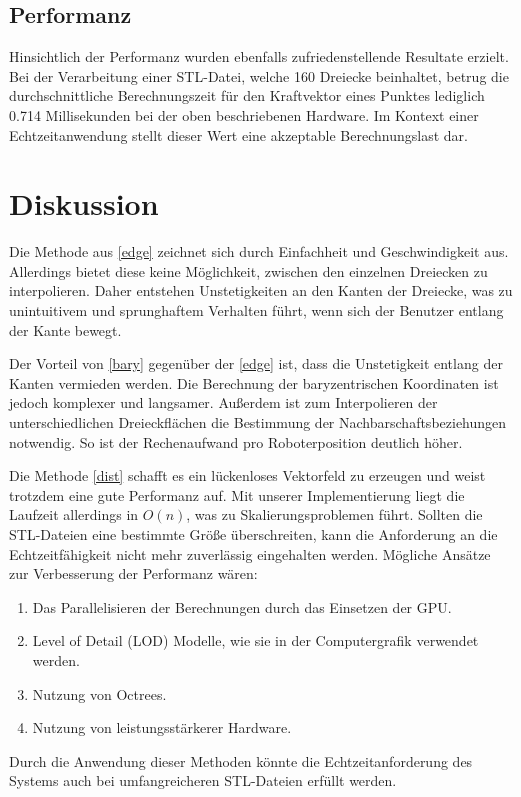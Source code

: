 \documentclass[conference]{IEEEtran}
\begin{document}
\subsection{Performanz}
Hinsichtlich der Performanz wurden ebenfalls zufriedenstellende Resultate erzielt. Bei der Verarbeitung einer STL-Datei, welche 160 Dreiecke beinhaltet, betrug die durchschnittliche Berechnungszeit für den Kraftvektor eines Punktes lediglich 0.714 Millisekunden bei der oben beschriebenen Hardware. Im Kontext einer Echtzeitanwendung stellt dieser Wert eine akzeptable Berechnungslast dar. 

\section{Diskussion}
Die Methode aus \ref*{edge} zeichnet sich durch Einfachheit und Geschwindigkeit aus. Allerdings bietet  diese keine Möglichkeit, zwischen den einzelnen Dreiecken zu interpolieren. Daher entstehen Unstetigkeiten an den Kanten der Dreiecke, was zu unintuitivem und sprunghaftem Verhalten führt, wenn sich der Benutzer entlang der Kante bewegt.

Der Vorteil von \ref*{bary} gegenüber der \ref*{edge} ist, dass die Unstetigkeit entlang der Kanten vermieden werden. Die Berechnung der baryzentrischen Koordinaten ist jedoch komplexer und langsamer. Außerdem ist zum Interpolieren der unterschiedlichen Dreieckflächen die Bestimmung der Nachbarschaftsbeziehungen notwendig. So ist der Rechenaufwand pro Roboterposition deutlich höher.

Die Methode \ref*{dist} schafft es ein lückenloses Vektorfeld zu erzeugen und weist trotzdem eine gute Performanz auf. Mit unserer Implementierung liegt die Laufzeit allerdings in $O(n)$, was zu Skalierungsproblemen führt. Sollten die STL-Dateien eine bestimmte Größe überschreiten, kann die Anforderung an die Echtzeitfähigkeit nicht mehr zuverlässig eingehalten werden. Mögliche Ansätze zur Verbesserung der Performanz wären: 
\begin{enumerate}
    \item Das Parallelisieren der Berechnungen durch das Einsetzen der GPU.
    \item Level of Detail (LOD) Modelle, wie sie in der Computergrafik verwendet werden.
    \item Nutzung von Octrees.
    \item Nutzung von leistungsstärkerer Hardware.
\end{enumerate}
Durch die Anwendung dieser Methoden könnte die Echtzeitanforderung des Systems auch bei umfangreicheren STL-Dateien erfüllt werden.
\end{document}

